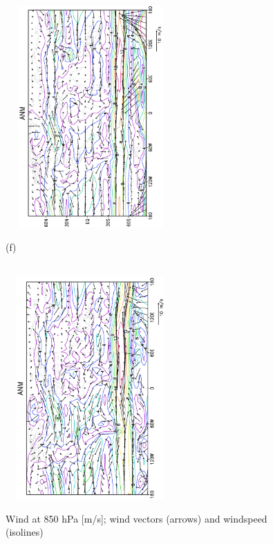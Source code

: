 \documentclass[12pt,a4paper,twoside,openright,headinclude,liststotoc,bibtotoc]{scrreprt}
\begin{document}
\begin{figure}[H]
{\includegraphics[height=8.5cm,width=6.5cm,angle=-90]
{eps/tmuv850.eps}
}
\parbox{8.5cm}{\hspace{0.25cm}\begin{scriptsize}(f)\end{scriptsize} \vspace{-0.7cm} \\
\includegraphics[height=8.5cm,width=6.5cm,angle=-90]
{eps/t21tmuv850.eps}
}
\caption[Wind at 850 hPa]{Wind at 850 hPa [m/s]; wind vectors (arrows) and windspeed (isolines)}
\label{img:u850}
\end{figure}
\end{document}
